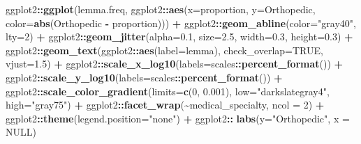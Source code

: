 \documentclass[
]{article}
\newenvironment{Shaded}{\begin{snugshade}}{\end{snugshade}}
\newcommand{\AttributeTok}[1]{\textcolor[rgb]{0.13,0.29,0.53}{#1}}
\newcommand{\ConstantTok}[1]{\textcolor[rgb]{0.56,0.35,0.01}{#1}}
\newcommand{\DecValTok}[1]{\textcolor[rgb]{0.00,0.00,0.81}{#1}}
\newcommand{\FloatTok}[1]{\textcolor[rgb]{0.00,0.00,0.81}{#1}}
\newcommand{\FunctionTok}[1]{\textcolor[rgb]{0.13,0.29,0.53}{\textbf{#1}}}
\newcommand{\NormalTok}[1]{#1}
\newcommand{\SpecialCharTok}[1]{\textcolor[rgb]{0.81,0.36,0.00}{\textbf{#1}}}
\newcommand{\StringTok}[1]{\textcolor[rgb]{0.31,0.60,0.02}{#1}}
\begin{document}
\begin{Shaded}
\begin{Highlighting}[]
\NormalTok{ggplot2}\SpecialCharTok{::}\FunctionTok{ggplot}\NormalTok{(lemma.freq, ggplot2}\SpecialCharTok{::}\FunctionTok{aes}\NormalTok{(}\AttributeTok{x=}\NormalTok{proportion, }
                                         \AttributeTok{y=}\StringTok{\textasciigrave{}}\AttributeTok{Orthopedic}\StringTok{\textasciigrave{}}\NormalTok{,}
                                         \AttributeTok{color=}\FunctionTok{abs}\NormalTok{(}\StringTok{\textasciigrave{}}\AttributeTok{Orthopedic}\StringTok{\textasciigrave{}} \SpecialCharTok{{-}}\NormalTok{ proportion))) }\SpecialCharTok{+} 
\NormalTok{  ggplot2}\SpecialCharTok{::}\FunctionTok{geom\_abline}\NormalTok{(}\AttributeTok{color=}\StringTok{"gray40"}\NormalTok{, }\AttributeTok{lty=}\DecValTok{2}\NormalTok{) }\SpecialCharTok{+}
\NormalTok{  ggplot2}\SpecialCharTok{::}\FunctionTok{geom\_jitter}\NormalTok{(}\AttributeTok{alpha=}\FloatTok{0.1}\NormalTok{, }\AttributeTok{size=}\FloatTok{2.5}\NormalTok{, }\AttributeTok{width=}\FloatTok{0.3}\NormalTok{, }\AttributeTok{height=}\FloatTok{0.3}\NormalTok{) }\SpecialCharTok{+}
\NormalTok{  ggplot2}\SpecialCharTok{::}\FunctionTok{geom\_text}\NormalTok{(ggplot2}\SpecialCharTok{::}\FunctionTok{aes}\NormalTok{(}\AttributeTok{label=}\NormalTok{lemma), }\AttributeTok{check\_overlap=}\ConstantTok{TRUE}\NormalTok{, }\AttributeTok{vjust=}\FloatTok{1.5}\NormalTok{) }\SpecialCharTok{+}
\NormalTok{  ggplot2}\SpecialCharTok{::}\FunctionTok{scale\_x\_log10}\NormalTok{(}\AttributeTok{labels=}\NormalTok{scales}\SpecialCharTok{::}\FunctionTok{percent\_format}\NormalTok{()) }\SpecialCharTok{+} 
\NormalTok{  ggplot2}\SpecialCharTok{::}\FunctionTok{scale\_y\_log10}\NormalTok{(}\AttributeTok{labels=}\NormalTok{scales}\SpecialCharTok{::}\FunctionTok{percent\_format}\NormalTok{()) }\SpecialCharTok{+} 
\NormalTok{  ggplot2}\SpecialCharTok{::}\FunctionTok{scale\_color\_gradient}\NormalTok{(}\AttributeTok{limits=}\FunctionTok{c}\NormalTok{(}\DecValTok{0}\NormalTok{, }\FloatTok{0.001}\NormalTok{), }\AttributeTok{low=}\StringTok{"darkslategray4"}\NormalTok{, }\AttributeTok{high=}\StringTok{"gray75"}\NormalTok{) }\SpecialCharTok{+}
\NormalTok{  ggplot2}\SpecialCharTok{::}\FunctionTok{facet\_wrap}\NormalTok{(}\SpecialCharTok{\textasciitilde{}}\NormalTok{medical\_specialty, }\AttributeTok{ncol =} \DecValTok{2}\NormalTok{) }\SpecialCharTok{+}
\NormalTok{  ggplot2}\SpecialCharTok{::}\FunctionTok{theme}\NormalTok{(}\AttributeTok{legend.position=}\StringTok{"none"}\NormalTok{) }\SpecialCharTok{+}
\NormalTok{  ggplot2}\SpecialCharTok{::} \FunctionTok{labs}\NormalTok{(}\AttributeTok{y=}\StringTok{"Orthopedic"}\NormalTok{, }\AttributeTok{x =} \ConstantTok{NULL}\NormalTok{)}
\end{Highlighting}
\end{Shaded}
\end{document}
